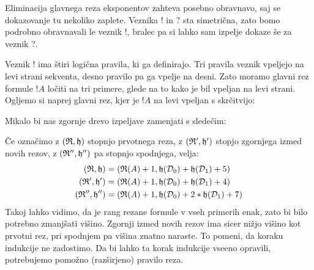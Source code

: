 Eliminacija glavnega reza eksponentov zahteva posebno obravnavo, saj se dokazovanje tu nekoliko zaplete. Veznika ! in ? sta simetrična, zato bomo podrobno obravnavali le veznik !, bralec pa si lahko sam izpelje dokaze še za veznik ?.

Veznik ! ima štiri logična pravila, ki ga definirajo. Tri pravila veznik vpeljejo na levi strani sekventa, desno pravilo pa ga vpelje na desni. Zato moramo glavni rez formule $!A$ ločiti na tri primere, glede na to kako je bil vpeljan na levi strani. Ogljemo si naprej glavni rez, kjer je $!A$ na levi vpeljan s skrčitvijo:
\begin{prooftree}


\end{prooftree}
Mikalo bi nas zgornje drevo izpeljave zamenjati s sledečim:
\begin{prooftree}




\end{prooftree}
Če označimo z $(\R,\h)$ stopnjo prvotnega reza, z $(\R',\h')$ stopjo zgornjega izmed novih rezov, z $(\R'',\h'')$ pa stopnjo spodnjega, velja:
\begin{align*}
    (\R,\h) &= (\R(A) + 1,\h(\D_0) + \h(\D_1) + 5)\\
    (\R',\h') &= (\R(A) + 1,\h(\D_0) + \h(\D_1) + 4)\\
    (\R'',\h'') &= (\R(A) + 1,\h(\D_0) + 2*\h(\D_1) + 7)
\end{align*}
Takoj lahko vidimo, da je rang rezane formule v vseh primerih enak, zato bi bilo potrebno zmanjšati višino. Zgornji izmed novih rezov ima sicer nižjo višino kot prvotni rez, pri spodnjem pa višina znatno naraste. To pomeni, da koraku indukcije ne zadostimo. Da bi lahko ta korak indukcije vseeno opravili, potrebujemo pomožno (razširjeno) pravilo reza.

